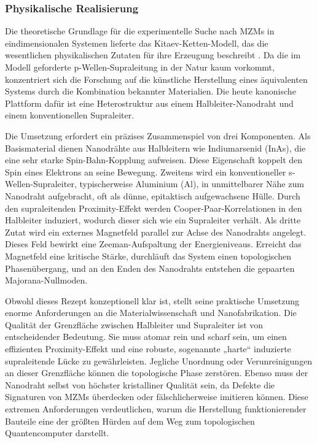 \subsubsection{Physikalische Realisierung}
Die theoretische Grundlage für die experimentelle Suche nach MZMs in eindimensionalen Systemen lieferte das Kitaev-Ketten-Modell, das die wesentlichen physikalischen Zutaten für ihre Erzeugung beschreibt \cite{PDFMicrosoftsMajorana2025}. Da die im Modell geforderte p-Wellen-Supraleitung in der Natur kaum vorkommt, konzentriert sich die Forschung auf die künstliche Herstellung eines äquivalenten Systems durch die Kombination bekannter Materialien. Die heute kanonische Plattform dafür ist eine Heterostruktur aus einem Halbleiter-Nanodraht und einem konventionellen Supraleiter.

Die Umsetzung erfordert ein präzises Zusammenspiel von drei Komponenten. Als Basismaterial dienen Nanodrähte aus Halbleitern wie Indiumarsenid (InAs), die eine sehr starke Spin-Bahn-Kopplung aufweisen. Diese Eigenschaft koppelt den Spin eines Elektrons an seine Bewegung. Zweitens wird ein konventioneller s-Wellen-Supraleiter, typischerweise Aluminium (Al), in unmittelbarer Nähe zum Nanodraht aufgebracht, oft als dünne, epitaktisch aufgewachsene Hülle. Durch den supraleitenden Proximity-Effekt werden Cooper-Paar-Korrelationen in den Halbleiter induziert, wodurch dieser sich wie ein Supraleiter verhält. Als dritte Zutat wird ein externes Magnetfeld parallel zur Achse des Nanodrahts angelegt. Dieses Feld bewirkt eine Zeeman-Aufspaltung der Energieniveaus. Erreicht das Magnetfeld eine kritische Stärke, durchläuft das System einen topologischen Phasenübergang, und an den Enden des Nanodrahts entstehen die gepaarten Majorana-Nullmoden. \cite{amorimMajoranaBraidingDynamics2015}

Obwohl dieses Rezept konzeptionell klar ist, stellt seine praktische Umsetzung enorme Anforderungen an die Materialwissenschaft und Nanofabrikation. Die Qualität der Grenzfläche zwischen Halbleiter und Supraleiter ist von entscheidender Bedeutung. Sie muss atomar rein und scharf sein, um einen effizienten Proximity-Effekt und eine robuste, sogenannte „harte“ induzierte supraleitende Lücke zu gewährleisten. Jegliche Unordnung oder Verunreinigungen an dieser Grenzfläche können die topologische Phase zerstören. Ebenso muss der Nanodraht selbst von höchster kristalliner Qualität sein, da Defekte die Signaturen von MZMs überdecken oder fälschlicherweise imitieren können. Diese extremen Anforderungen verdeutlichen, warum die Herstellung funktionierender Bauteile eine der größten Hürden auf dem Weg zum topologischen Quantencomputer darstellt.


